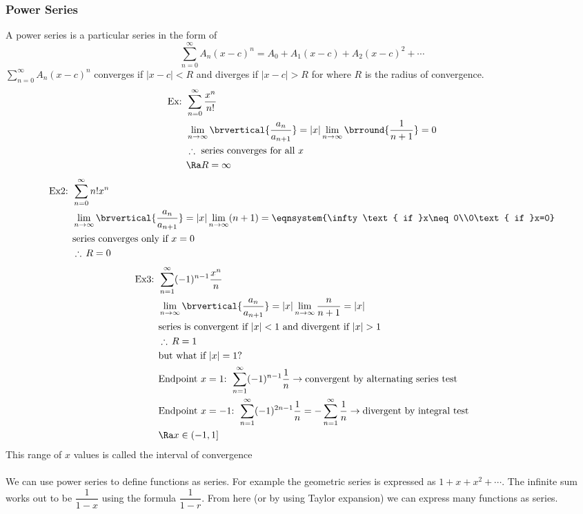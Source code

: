 \subsubsection{Power Series}
A power series is a particular series in the form of
$$\sum_{n=0}^\infty A_n(x-c)^n=A_0+A_1(x-c)+A_2(x-c)^2+\cdots$$
$\displaystyle{\sum_{n=0}^\infty A_n(x-c)^n}$ converges if $|x-c|<R$ and diverges if $|x-c|>R$ for where $R$ is the radius of convergence.\\
\begin{align*}
    \text{Ex: }&\sum_{n=0}^\infty\frac{x^n}{n!}\\
    &\lim_{n\to\infty}\brvertical{\frac{a_n}{a_{n+1}}}=|x|\lim_{n\to\infty}\brround{\frac{1}{n+1}}=0\\
    &\therefore\text{ series converges for all $x$}\\
    &\Ra R=\infty
\end{align*}
\begin{align*}
    \text{Ex2: }&\sum_{n=0}^\infty n!x^n\\
    &\lim_{n\to\infty}\brvertical{\frac{a_n}{a_{n+1}}}=|x|\lim_{n\to\infty}(n+1)=\eqnsystem{\infty\text{ if }x\neq 0\\0\text{ if }x=0}\\
    &\text{series converges only if }x=0\\
    &\therefore\,R=0
\end{align*}
\begin{align*}
    \text{Ex3: }&\sum_{n=1}^\infty(-1)^{n-1}\frac{x^n}{n}\\
    &\lim_{n\to\infty}\brvertical{\frac{a_n}{a_{n+1}}}=|x|\lim_{n\to\infty}\frac{n}{n+1}=|x|\\
    &\text{series is convergent if $|x|<1$ and divergent if $|x|>1$}\\
    &\therefore\, R=1\\
    &\text{but what if $|x|=1$?}\\
    &\text{Endpoint $x=1$: }\sum_{n=1}^\infty(-1)^{n-1}\frac{1}{n}\to\text{convergent by alternating series test}\\
    &\text{Endpoint $x=-1$: }\sum_{n=1}^\infty(-1)^{2n-1}\frac{1}{n}=-\sum_{n=1}^\infty\frac{1}{n}\to\text{divergent by integral test}\\
    &\Ra x\in(-1,1]
\end{align*}
This range of $x$ values is called the interval of convergence\\
\\
We can use power series to define functions as series. For example the geometric series is expressed as ${1+x+x^2+\cdots}$. The infinite sum works out to be $\dfrac{1}{1-x}$ using the formula $\dfrac{1}{1-r}$. From here (or by using Taylor expansion) we can express many functions as series.\\
